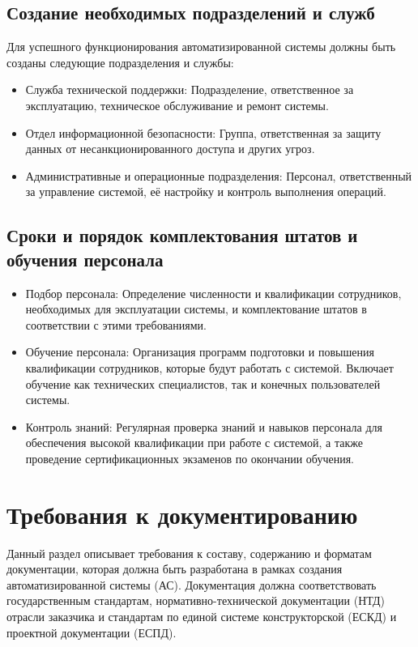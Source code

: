 \subsection{Создание необходимых подразделений и служб}
Для успешного функционирования автоматизированной системы должны быть созданы следующие подразделения и службы:
\begin{itemize}
    \item Служба технической поддержки: Подразделение, ответственное за эксплуатацию, техническое обслуживание и ремонт системы.
    \item Отдел информационной безопасности: Группа, ответственная за защиту данных от несанкционированного доступа и других угроз.
    \item Административные и операционные подразделения: Персонал, ответственный за управление системой, её настройку и контроль выполнения операций.
\end{itemize}

\subsection{Сроки и порядок комплектования штатов и обучения персонала}
\begin{itemize}
    \item Подбор персонала: Определение численности и квалификации сотрудников, необходимых для эксплуатации системы, и комплектование штатов в соответствии с этими требованиями.
    \item Обучение персонала: Организация программ подготовки и повышения квалификации сотрудников, которые будут работать с системой. Включает обучение как технических специалистов, так и конечных пользователей системы.
    \item Контроль знаний: Регулярная проверка знаний и навыков персонала для обеспечения высокой квалификации при работе с системой, а также проведение сертификационных экзаменов по окончании обучения.
\end{itemize}

\section{Требования к документированию}

Данный раздел описывает требования к составу, содержанию и форматам документации, которая должна быть разработана в рамках создания автоматизированной системы (АС). Документация должна соответствовать государственным стандартам, нормативно-технической документации (НТД) отрасли заказчика и стандартам по единой системе конструкторской (ЕСКД) и проектной документации (ЕСПД).

